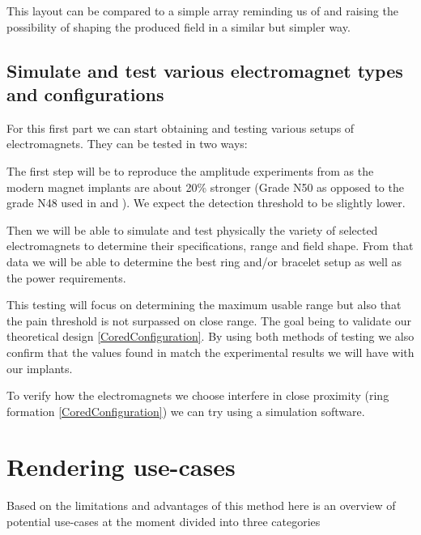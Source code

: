 \documentclass[10pt,journal,compsoc]{IEEEtran}
\begin{document}
	This layout can be compared to a simple array reminding us of \cite{zhang2016ieee} and raising the possibility of shaping the produced field in a similar but simpler way.
	
	\subsection{Simulate and test various electromagnet types and configurations}
	For this first part we can start obtaining and testing various setups of electromagnets. They can be tested in two ways:
	
	The first step will be to reproduce the amplitude experiments from \cite{harrison2018tf} as the modern magnet implants are about 20\% stronger (Grade N50 as opposed to the grade N48 used in \cite{harrison2018tf} and \cite{hameed2010ieee}). We expect the detection threshold to be slightly lower.
	
	Then we will be able to simulate and test physically the variety of selected electromagnets to determine their specifications, range and field shape. From that data we will be able to determine the best ring and/or bracelet setup as well as the power requirements.
	
	
	This testing will focus on determining the maximum usable range but also that the pain threshold is not surpassed on close range. The goal being to validate our theoretical design \ref{CoredConfiguration}.
	By using both methods of testing we also confirm that the values found in \cite{harrison2018tf} match the experimental results we will have with our implants.
	
	To verify how the electromagnets we choose interfere in close proximity (ring formation \ref{CoredConfiguration}) we can try using a simulation software.
	

\section{Rendering use-cases}
	Based on the limitations and advantages of this method here is an overview of potential use-cases at the moment divided into three categories
\end{document}

